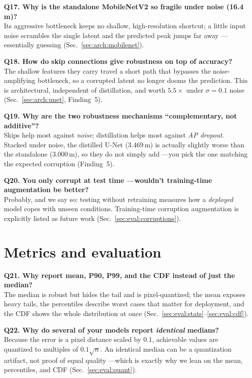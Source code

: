 \textbf{Q17. Why is the standalone MobileNetV2 so fragile under noise (16.4\,m)?}\\
Its aggressive bottleneck keeps no shallow, high-resolution shortcut; a little input noise scrambles
the single latent and the predicted peak jumps far away ---essentially guessing
(Sec.~\ref{sec:arch:mobilenet}).

\textbf{Q18. How do skip connections give robustness on top of accuracy?}\\
The shallow features they carry travel a short path that bypasses the noise-amplifying bottleneck, so a
corrupted latent no longer dooms the prediction. This is architectural, independent of distillation,
and worth $5.5\times$ under $\sigma{=}0.1$ noise (Sec.~\ref{sec:arch:unet}, Finding~5).

\textbf{Q19. Why are the two robustness mechanisms ``complementary, not additive''?}\\
Skips help most against \emph{noise}; distillation helps most against \emph{AP dropout}. Stacked under
noise, the distilled U-Net ($3.469$\,m) is actually slightly worse than the standalone ($3.000$\,m), so
they do not simply add ---you pick the one matching the expected corruption (Finding~5).

\textbf{Q20. You only corrupt at test time ---wouldn't training-time augmentation be better?}\\
Probably, and we say so: testing without retraining measures how a \emph{deployed} model copes with
unseen conditions. Training-time corruption augmentation is explicitly listed as future work
(Sec.~\ref{sec:eval:corruptions}).

\section{Metrics and evaluation}
\label{sec:qa:metrics}

\textbf{Q21. Why report mean, P90, P99, and the CDF instead of just the median?}\\
The median is robust but hides the tail and is pixel-quantized; the mean exposes heavy tails, the
percentiles describe worst cases that matter for deployment, and the CDF shows the whole distribution
at once (Sec.~\ref{sec:eval:stats}--\ref{sec:eval:cdf}).

\textbf{Q22. Why do several of your models report \emph{identical} medians?}\\
Because the error is a pixel distance scaled by $0.1$, achievable values are quantized to multiples of
$0.1\sqrt{n}$. An identical median can be a quantization artifact, not proof of equal quality ---which
is exactly why we lean on the mean, percentiles, and CDF (Sec.~\ref{sec:eval:quant}).

